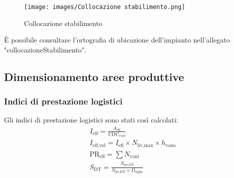 \documentclass[11pt]{article}
\begin{document}
\begin{table}[H]
    \centering
    \renewcommand{\arraystretch}{1.5}
    \caption{Dettagli del terreno}
    \label{tab:dettagli_terreno}
\end{table}

\begin{figure}[H]
    \centering
    \texttt{[image: images/Collocazione stabilimento.png]}
    \caption{Collocazione stabilimento}
    \label{fig: Collocazione stabilimento}
\end{figure}

È possibile consultare l'ortografia di ubicazione dell'impianto nell'allegato "{{collocazioneStabilimento}}".
\newpage

\subsection{Dimensionamento aree produttive}
\subsubsection{Indici di prestazione logistici}
Gli indici di prestazione logistici sono stati così calcolati:
\begin{align*}
    & I_\text{eff} = \frac{A_\text{eff}}{\text{UDC}_{rich}} \\
    & I_\text{eff,vol} = I_\text{eff} \times N_\text{liv,max} \times h_\text{vano} \\
    & \text{PR}_\text{eff} = \sum N_\text{vani} \\
    & S_\text{DT} = \frac{N_\text{liv,DT}}{N_\text{liv,DT} \times D_\text{righe}}
\end{align*}
\end{document}
